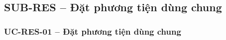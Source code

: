 \newcommand{\RESDiagramFigure}[3]{%
  \begingroup
  \setlength{\intextsep}{0pt}
  \InsertArtifact[0.90\textheight]{#1}{#2}{#3}{}
  \endgroup
}

\subsection{SUB-RES -- Đặt phương tiện dùng chung}


\subsubsection{UC-RES-01 -- Đặt phương tiện dùng chung}


